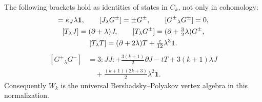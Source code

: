 \begin{proposition}\label{prop:cbc27-bp-products}
The following brackets hold as identities of states in $C_k$, not only in cohomology:
\begin{gather}
 [J_\lambda J]=\kappa_J\lambda\mathbf1,\qquad
 [J_\lambda G^\pm]=\pm G^\pm,\qquad[ G^\pm{}_{\lambda}G^\pm]=0,\label{eq:cbc27-j-products}\\
 [T_\lambda J]=(\partial+\lambda)J,\qquad
 [T_\lambda G^\pm]=(\partial+\tfrac32\lambda)G^\pm,\notag\\
 [T_\lambda T]=(\partial+2\lambda)T+\tfrac{c}{12}\lambda^3\mathbf1.\notag
\end{gather}
\begin{equation}\label{eq:cbc27-g-products}
\begin{split}
 [G^+{}_{\lambda}G^-]
 &=3:JJ:+\tfrac{3(k+1)}2\partial J-tT
   +3(k+1)\lambda J\\
 &\hspace{12pt}+\tfrac{(k+1)(2k+3)}2\lambda^2\mathbf1.
\end{split}
\end{equation}
Consequently $W_k$ is the universal Bershadsky--Polyakov vertex algebra in this normalization.
\end{proposition}

